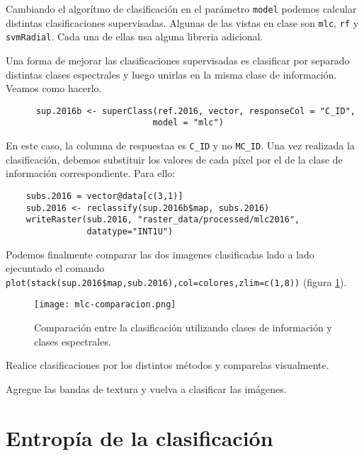 Cambiando el algor\'itmo de clasificaci\'on en el par\'ametro \texttt{model} podemos calcular distintas clasificaciones supervisadas. Algunas de las vistas en clase son \texttt{mlc}, \texttt{rf} y \texttt{svmRadial}. Cada una de ellas usa alguna libreria adicional.

\begin{exa}
  Una forma de mejorar las clasificaciones supervisadas es clasificar por separado distintas clases espectrales y luego unirlas en la misma clase de informaci\'on. Veamos como hacerlo.

  \begin{lstlisting}
      sup.2016b <- superClass(ref.2016, vector, responseCol = "C_ID",
                             model = "mlc")
  \end{lstlisting}

  En este caso, la columna de respuestaa es \texttt{C\_ID} y no \texttt{MC\_ID}.  Una vez realizada la clasificaci\'on, debemos substituir los valores de cada p\'ixel por el de la clase de informaci\'on correspondiente. Para ello:

  \begin{lstlisting}
    subs.2016 = vector@data[c(3,1)]
    sub.2016 <- reclassify(sup.2016b$map, subs.2016)
    writeRaster(sub.2016, "raster_data/processed/mlc2016",
                datatype="INT1U")
  \end{lstlisting}

    Podemos finalmente comparar las dos imagenes clasificadas lado a lado ejecuntado el comando \verb|plot(stack(sup.2016$map,sub.2016),col=colores,zlim=c(1,8))| (figura \ref{fig:mlc}).

    \begin{figure}[h!]
      \centering
      \texttt{[image: mlc-comparacion.png]}
      \caption{Comparaci\'on entre la clasificaci\'on utilizando clases de informaci\'on y clases espectrales.}
      \label{fig:mlc}
    \end{figure}
\end{exa}

\begin{act}
    Realice clasificaciones por los distintos m\'etodos y comparelas visualmente.
\end{act}

\begin{act}
    Agregue las bandas de textura y vuelva a clasificar las im\'agenes.
\end{act}

\section{Entrop\'ia de la clasificaci\'on}

